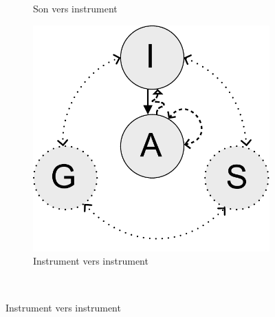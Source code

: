 \begin{figure}[!htbp]
{\begin{subfigure}[b]{.33\textwidth}
			\caption{Son vers instrument}
		\end{subfigure}%
		\hspace{.02\linewidth}
		\begin{subfigure}[b]{.33\textwidth}
			\centering
			\includegraphics[width=0.9\linewidth]{gfx/03_gesture/gesture-inference-i.pdf}
			\caption{Instrument vers instrument}
		\end{subfigure}%
	}\\
\end{figure}
